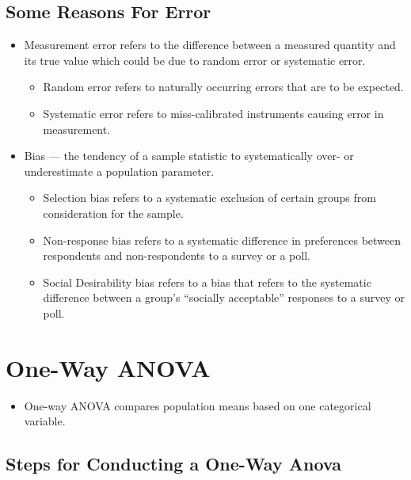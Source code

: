 \documentclass[
  letterpaper,
  DIV=11,
  numbers=noendperiod]{scrreprt}
\providecommand{\tightlist}{%
  \setlength{\itemsep}{0pt}\setlength{\parskip}{0pt}}\usepackage{longtable,booktabs,array}
\begin{document}
\section{Some Reasons For Error}\label{some-reasons-for-error}

\begin{itemize}
\tightlist
\item
  Measurement error refers to the difference between a measured quantity
  and its true value which could be due to random error or systematic
  error.

  \begin{itemize}
  \tightlist
  \item
    Random error refers to naturally occurring errors that are to be
    expected.
  \item
    Systematic error refers to miss-calibrated instruments causing error
    in measurement.
  \end{itemize}
\item
  Bias --- the tendency of a sample statistic to systematically over- or
  underestimate a population parameter.

  \begin{itemize}
  \tightlist
  \item
    Selection bias refers to a systematic exclusion of certain groups
    from consideration for the sample.
  \item
    Non-response bias refers to a systematic difference in preferences
    between respondents and non-respondents to a survey or a poll.
  \item
    Social Desirability bias refers to a bias that refers to the
    systematic difference between a group's ``socially acceptable''
    responses to a survey or poll.
  \end{itemize}
\end{itemize}


\chapter{One-Way ANOVA}\label{one-way-anova}

\begin{itemize}
\tightlist
\item
  One-way ANOVA compares population means based on one categorical
  variable.
\end{itemize}

\section{Steps for Conducting a One-Way
Anova}\label{steps-for-conducting-a-one-way-anova}
\end{document}
